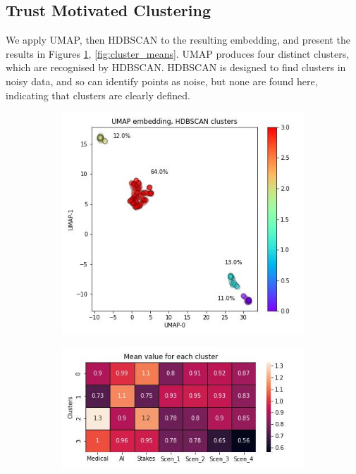 \documentclass[manuscript,screen,review]{acmart}
\begin{document}
\subsection{Trust Motivated Clustering}



We apply UMAP, then HDBSCAN to the resulting embedding, and present the results in Figures \ref{fig:embedding}, \ref{fig:cluster_means}. UMAP produces four distinct clusters, which are recognised by HDBSCAN. HDBSCAN is designed to find clusters in noisy data, and so can identify points as noise, but none are found here, indicating that clusters are clearly defined.

\begin{figure}
\centering
\begin{subfigure}{0.5\textwidth}
  \centering
  \includegraphics[width=\linewidth]{graphics/UMAP_HDBSCAN.jpg}
  \caption{}
  \label{fig:embedding}
\end{subfigure}%
\begin{subfigure}{0.55\textwidth}
  \centering
  \includegraphics[width=\linewidth]{graphics/clustering_means.jpg}

\end{subfigure}
\end{figure}
\end{document}
